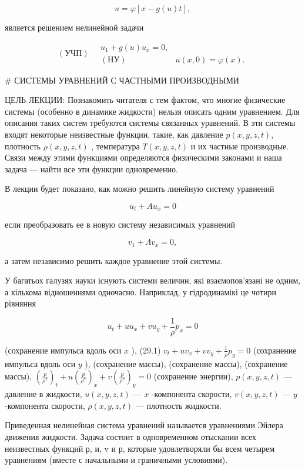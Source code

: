 \documentclass[
  ukrainian,
]{article}
\begin{document}
\[
u = \varphi[x - g(u) t],
\]

является решением нелинейной задачи

\[
(\text{УЧП}) \quad \begin{array}{ll} u_1 + g(u) u_x = 0, \\ (\text{НУ}) & u(x, 0) = \varphi(x). \end{array}
\]

\# СИСТЕМЫ УРАВНЕНИЙ С ЧАСТНЫМИ ПРОИЗВОДНЫМИ

ЦЕЛЬ ЛЕКЦИИ: Познакомить читателя с тем фактом, что многие физические
системы (особенно в динамике жидкости) нельзя описать одним уравнением.
Для описания таких систем требуются системы связанных уравнений. В эти
системы входят некоторые неизвестные функции, такие, как давление
\(p(x, y, z, t)\), плотность \(\rho(x, y, z, t)\) , температура
\(T(x, y, z, t)\) и их частные производные. Связи между этими функциями
определяются физическими законами и наша задача --- найти все эти
функции одновременно.

В лекции будет показано, как можно решить линейную систему уравнений

\[
u_t + Au_x = 0
\]

если преобразовать ее в новую систему независимых уравнений

\[
v_1 + \Lambda v_x = 0,
\]

а затем независимо решить каждое уравнение этой системы.

У багатьох галузях науки існують системи величин, які взаємопов'язані не
одним, а кількома відношеннями одночасно. Наприклад, у гідродинамікі це
чотири рівняння

\[
u_t + uu_x + vu_y + \frac{1}{\rho} p_x = 0
\]

(сохранение импульса вдоль оси \(x\) ), (29.1)
\(v_t + uv_x + vv_y + \frac{1}{\rho} p_y = 0\) (сохранение импульса
вдоль оси \(y\) ), (сохранение массы), (сохранение массы), (сохранение
массы),
\(\left(\frac{p}{\rho^{\gamma}}\right)_t + u\left(\frac{p}{\rho^{\gamma}}\right)_x + v\left(\frac{p}{\rho^{\gamma}}\right)_y = 0\)
(сохранение энергии), \(p(x, y, z, t)\) --- давление в жидкости,
\(u(x, y, z, t)\) --- \(x\) -компонента скорости, \(v(x, y, z, t)\) ---
\(y\) -компонента скорости, \(\rho(x, y, z, t)\) --- плотность жидкости.

Приведенная нелинейная система уравнений называется уравнениями Эйлера
движения жидкости. Задача состоит в одновременном отыскании всех
неизвестных функций р, и, v и р, которые удовлетворяли бы всем четырем
уравнениям (вместе с начальными и граничными условиями).
\end{document}
